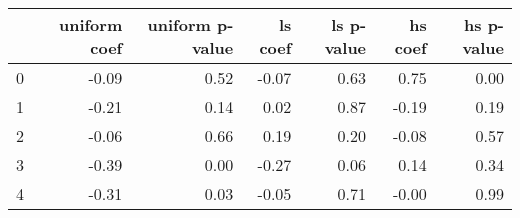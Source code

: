 \begin{tabular}{lrrrrrr}
\toprule
 & uniform coef & uniform p-value & ls coef & ls p-value & hs coef & hs p-value \\
\midrule
0 & -0.09 & 0.52 & -0.07 & 0.63 & 0.75 & 0.00 \\
1 & -0.21 & 0.14 & 0.02 & 0.87 & -0.19 & 0.19 \\
2 & -0.06 & 0.66 & 0.19 & 0.20 & -0.08 & 0.57 \\
3 & -0.39 & 0.00 & -0.27 & 0.06 & 0.14 & 0.34 \\
4 & -0.31 & 0.03 & -0.05 & 0.71 & -0.00 & 0.99 \\
\bottomrule
\end{tabular}
